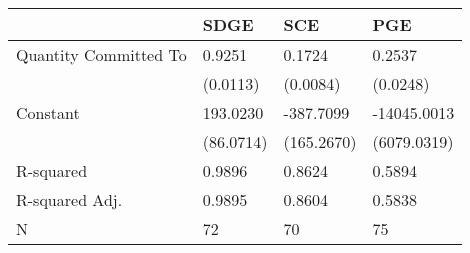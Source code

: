 \begin{tabular}{llll}
\hline
                      & SDGE      & SCE        & PGE          \\
\hline
Quantity Committed To & 0.9251    & 0.1724     & 0.2537       \\
                      & (0.0113)  & (0.0084)   & (0.0248)     \\
Constant              & 193.0230  & -387.7099  & -14045.0013  \\
                      & (86.0714) & (165.2670) & (6079.0319)  \\
R-squared             & 0.9896    & 0.8624     & 0.5894       \\
R-squared Adj.        & 0.9895    & 0.8604     & 0.5838       \\
N                     & 72        & 70         & 75           \\
\hline
\end{tabular}